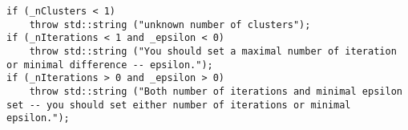 \begin{verbatim}
if (_nClusters < 1)
	throw std::string ("unknown number of clusters");
if (_nIterations < 1 and _epsilon < 0)
	throw std::string ("You should set a maximal number of iteration or minimal difference -- epsilon.");
if (_nIterations > 0 and _epsilon > 0)
	throw std::string ("Both number of iterations and minimal epsilon set -- you should set either number of iterations or minimal epsilon.");
\end{verbatim}